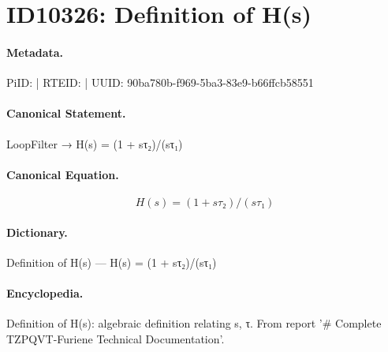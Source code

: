 \section*{ID10326: Definition of H(s)}
\paragraph{Metadata.}
PiID:  | RTEID:  | UUID: 90ba780b-f969-5ba3-83e9-b66ffcb58551

\paragraph{Canonical Statement.}
LoopFilter → H(s) = (1 + sτ₂)/(sτ₁)

\paragraph{Canonical Equation.}
\[
H(s) = (1 + sτ₂)/(sτ₁)
\]

\paragraph{Dictionary.}
Definition of H(s) — H(s) = (1 + sτ₂)/(sτ₁)

\paragraph{Encyclopedia.}
Definition of H(s): algebraic definition relating s, τ. From report '\# Complete TZPQVT-Furiene Technical Documentation'.
